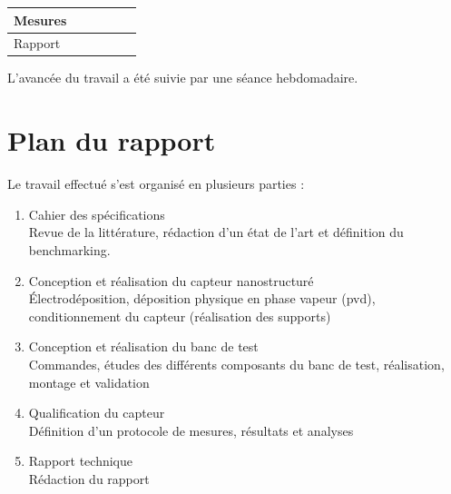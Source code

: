\begin{table}[H]
\begin{tabular}{lllllllll}
        \multicolumn{1}{|l|}{Mesures}                                                                             & \multicolumn{1}{l|}{}                                                         & \multicolumn{3}{l|}{}                                                         & \multicolumn{1}{l|}{}                                                         & \multicolumn{1}{l|}{}                                                         & \multicolumn{2}{l|}{\cellcolor[HTML]{9AFF99}}                                                              \\ \hline
        \multicolumn{1}{|l|}{Rapport}                                                                             & \multicolumn{8}{l|}{\cellcolor[HTML]{D3FDD3}}                                                                                                                                                                                                                                                                                                                                                                                              \\ \hline
    \end{tabular}
\end{table}

L'avancée du travail a été suivie par une séance hebdomadaire. 

\section{Plan du rapport}
Le travail effectué s'est organisé en plusieurs parties : \\
\begin{enumerate}
    \item Cahier des spécifications\\
          Revue de la littérature, rédaction d'un état de l'art et définition du benchmarking. \\
    \item Conception et réalisation du capteur nanostructuré\\
          Électrodéposition, déposition physique en phase vapeur (\gls{pvd}), conditionnement du capteur (réalisation des supports)\\
    \item Conception et réalisation du banc de test\\
          Commandes, études des différents composants du banc de test, réalisation, montage et validation\\
    \item Qualification du capteur\\
          Définition d'un protocole de mesures, résultats et analyses\\
    \item Rapport technique\\
          Rédaction du rapport
\end{enumerate}


